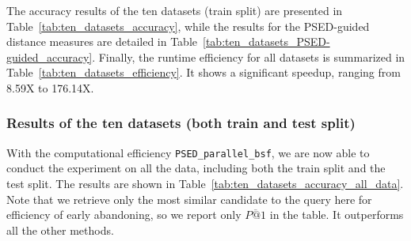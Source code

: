 


The accuracy results of the ten datasets (train split) are presented in Table~\ref{tab:ten_datasets_accuracy}, while the results for the PSED-guided distance measures are detailed in Table~\ref{tab:ten_datasets_PSED-guided_accuracy}. 
Finally, the runtime efficiency for all datasets is summarized in Table~\ref{tab:ten_datasets_efficiency}.
It shows a significant speedup, ranging from 8.59X to 176.14X.

\subsubsection{Results of the ten datasets (both train and test split)} %


With the computational efficiency \texttt{PSED\_parallel\_bsf}, we are now able to conduct the experiment on all the data, including both the train split and the test split.
The results are shown in Table~\ref{tab:ten_datasets_accuracy_all_data}.
Note that we retrieve only the most similar candidate to the query here for efficiency of early abandoning, so we report only $\overline{P@1}$ in the table. 
It outperforms all the other methods.